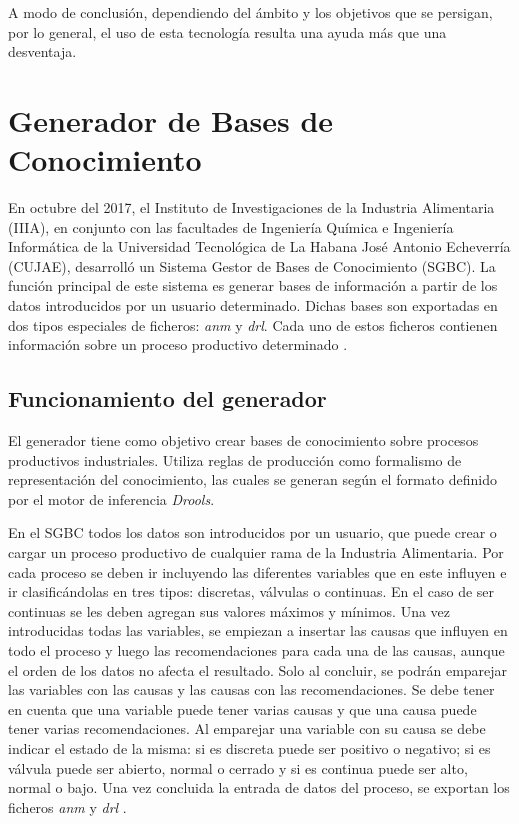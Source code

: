 A modo de conclusión, dependiendo del ámbito y los objetivos que se persigan, por lo general, el uso de esta tecnología resulta una ayuda más que una desventaja.


\section{Generador de Bases de Conocimiento}
En octubre del 2017, el Instituto de Investigaciones de la Industria Alimentaria (IIIA), en conjunto con las facultades de Ingeniería Química e Ingeniería Informática de la Universidad Tecnológica de La Habana José Antonio Echeverría (CUJAE), desarrolló un Sistema Gestor de Bases de Conocimiento (SGBC). La función principal de este sistema es generar bases de información a partir de los datos introducidos por un usuario determinado. Dichas bases son exportadas en dos tipos especiales de ficheros: \textsl{anm} y \textsl{drl}. Cada uno de estos ficheros contienen información sobre un proceso productivo determinado \cite{Lemus2018}.

\subsection{Funcionamiento del generador}
El generador tiene como objetivo crear bases de conocimiento sobre procesos productivos industriales. Utiliza reglas de producción como formalismo de representación del conocimiento, las cuales se generan según el formato definido por el motor de inferencia \textsl{Drools}.

En el SGBC todos los datos son introducidos por un usuario, que puede crear o cargar un proceso productivo de cualquier rama de la Industria Alimentaria. Por cada proceso se deben ir incluyendo las diferentes variables que en este influyen e ir clasificándolas en tres tipos: discretas, válvulas o continuas. En el caso de ser continuas se les deben agregan sus valores máximos y mínimos. Una vez introducidas todas las variables, se empiezan a insertar las causas que influyen en todo el proceso y luego las recomendaciones para cada una de las causas, aunque el orden de los datos no afecta el resultado. Solo al concluir, se podrán emparejar las variables con las causas y las causas con las recomendaciones. Se debe tener en cuenta que una variable puede tener varias causas y que una causa puede tener varias recomendaciones. Al emparejar una variable con su causa se debe indicar el estado de la misma: si es discreta puede ser positivo o negativo; si es válvula puede ser abierto, normal o cerrado y si es continua puede ser alto, normal o bajo. Una vez concluida la entrada de datos del proceso, se exportan los ficheros \textsl{anm} y \textsl{drl} \cite{Riveron2017}.


